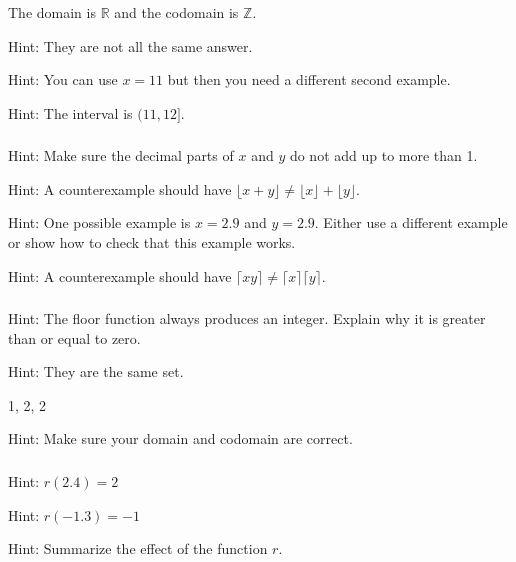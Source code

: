 \subsubsection*{ \answers}
\begin{apart}
    \item The domain is $\mathbb{R}$ and the codomain is $\mathbb{Z}$.
    \item Hint: They are not all the same answer.
    \item Hint: You can use $x=11$ but then you need a different second example.
    \item Hint: The interval is $(11,12]$.
\end{apart}

\subsubsection*{ \answers}
\begin{apart}
    \item Hint: Make sure the decimal parts of $x$ and $y$ do not add up to more than 1.
    \item Hint: A counterexample should have $\lfloor x+y \rfloor \neq \lfloor x \rfloor + \lfloor y \rfloor$.
    \item Hint: One possible example is $x = 2.9$ and $y = 2.9$.  Either use a different example or show how to check that this example works.
    \item Hint: A counterexample should have $\lceil xy \rceil \neq \lceil x \rceil \lceil y \rceil$.
\end{apart}

\subsubsection*{ \answers}
\begin{apart}
    \item Hint: The floor function always produces an integer. Explain why it is greater than or equal to zero.
    \item Hint: They are the same set.
    \item 1, 2, 2
    \item Hint: Make sure your domain and codomain are correct.
\end{apart}

\subsubsection*{ \answers}
\begin{apart}
    \item Hint: $r(2.4)=2$
    \item Hint: $r(-1.3) = -1$
    \item Hint: Summarize the effect of the function $r$.
\end{apart}

